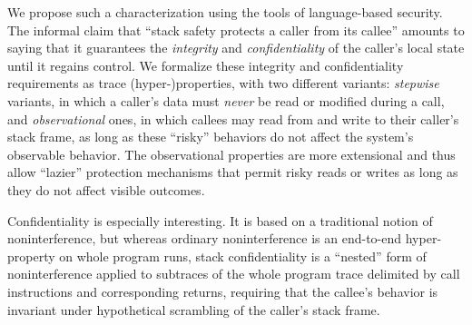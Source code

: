 \documentclass[acmtog,review,anonymous]{acmart}\settopmatter{printfolios=true,printccs=false,printacmref=false}
\begin{document}
We propose such a characterization
using the tools of language-based security. The informal claim that
``stack safety protects a caller from its callee'' amounts to saying
that it guarantees
the {\em integrity} and {\em confidentiality} of the caller's local state
until it regains control.
%
We formalize these integrity and confidentiality requirements as trace
(hyper-)properties, with two different
variants: {\em stepwise} variants, in which a caller's data must {\em never} be
read or modified during a call, and {\em observational} ones, in which
callees may read from and write to their caller's stack frame, as
long as these ``risky'' behaviors do not affect the system's observable
behavior. The observational properties are more extensional and thus
allow ``lazier'' protection mechanisms that permit risky reads or
writes as long as they do not affect visible outcomes.

Confidentiality is especially interesting.  It is based on a traditional
notion of noninterference, but whereas ordinary noninterference is
an end-to-end hyper-property on whole program runs, stack confidentiality is
a ``nested'' form of
noninterference applied to
subtraces of the whole program trace delimited by call instructions and
corresponding returns, requiring that the callee's behavior is invariant
under hypothetical scrambling of the caller's stack frame.
\end{document}
